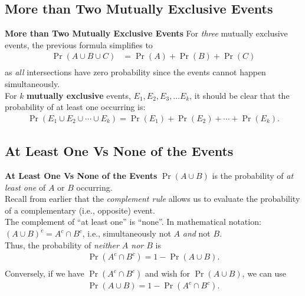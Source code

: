 \documentclass[compress]{beamer}        %
\makeatletter
\newcommand{\tcb}{\textcolor{beamer@blendedblue}}
\makeatother
\begin{document}
\subsection{More than Two Mutually Exclusive Events}
\begin{frame}{\bf \tcb{More than Two Mutually Exclusive Events}}
For \emph{three} mutually exclusive events, the previous formula simplifies to
\begin{align*}
\Pr(A \cup B \cup C) &= \Pr(A) + \Pr(B) + \Pr(C)\\[-0.5cm]
\end{align*}
as \emph{all} intersections have zero probability since the events cannot happen simultaneously.\\[0.5cm]

For {\boldmath$k$} {\bf mutually exclusive} events, $E_1, E_2, E_3, \ldots E_k$, it should be clear that the probability of at least one occurring is:
\begin{align*}
\boxed{\Pr(E_1 \cup E_2 \cup \cdots \cup E_k) = \Pr(E_1) + \Pr(E_2) + \cdots + \Pr(E_k)}.%
\end{align*}


\end{frame}


\subsection{At Least One Vs None of the Events}
\begin{frame}{\bf \tcb{At Least One Vs None of the Events}}
$\Pr(A \cup B)$ is the probability of \emph{at least one} of $A$ or $B$ occurring.\\[0.5cm]

Recall from earlier that the \emph{complement rule} allows us to evaluate the probability of a complementary (i.e., opposite) event.\\[0.4cm]

The complement of ``at least one'' is ``none''. In mathematical notation: $(A \cup B)^c = A^c \cap B^c$, i.e., simultaneously not $A$ \emph{and} not $B$.\\[0.4cm]

Thus, the probability of \emph{neither $A$ nor $B$} is
\begin{align*}
\boxed{\Pr(A^c \cap B^c) = 1 - \Pr(A \cup B)}.\\[-0.2cm]
\end{align*}
Conversely, if we have $\Pr(A^c \cap B^c)$ and wish for $\Pr(A \cup B)$, we can use
\begin{align*}
\boxed{\Pr(A \cup B) = 1 - \Pr(A^c \cap B^c)}.
\end{align*}

\end{frame}
\end{document}
